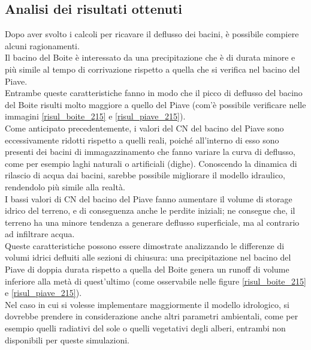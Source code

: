 \subsection{Analisi dei risultati ottenuti}
Dopo aver svolto i calcoli per ricavare il deflusso dei bacini, è possibile compiere alcuni ragionamenti.\\
Il bacino del Boite è interessato da una precipitazione che è di durata minore e più simile al tempo di corrivazione rispetto a quella che si verifica nel bacino del Piave.\\
Entrambe queste caratteristiche fanno in modo che il picco di deflusso del bacino del Boite risulti molto maggiore a quello del Piave (com'è possibile verificare nelle immagini \ref{risul_boite_215} e \ref{risul_piave_215}).\\
Come anticipato precedentemente, i valori del CN del bacino del Piave sono eccessivamente ridotti rispetto a quelli reali, poiché all'interno di esso sono presenti dei bacini di immagazzinamento che fanno variare la curva di deflusso, come per esempio laghi naturali o artificiali (dighe). Conoscendo la dinamica di rilascio di acqua dai bacini, sarebbe possibile migliorare il modello idraulico, rendendolo più simile alla realtà.\\
I bassi valori di CN del bacino del Piave fanno aumentare il volume di storage idrico del terreno, e di conseguenza anche le perdite iniziali; ne consegue che, il terreno ha una minore tendenza a generare deflusso superficiale, ma al contrario ad infiltrare acqua.\\
Queste caratteristiche possono essere dimostrate analizzando le differenze di volumi idrici defluiti alle sezioni di chiusura: una precipitazione nel bacino del Piave di doppia durata rispetto a quella del Boite genera un runoff di volume inferiore alla metà di quest'ultimo (come osservabile nelle figure \ref{risul_boite_215} e \ref{risul_piave_215}).\\
Nel caso in cui si volesse implementare maggiormente il modello idrologico, si dovrebbe prendere in considerazione anche altri parametri ambientali, come per esempio quelli radiativi del sole o quelli vegetativi degli alberi, entrambi non disponibili per queste simulazioni.